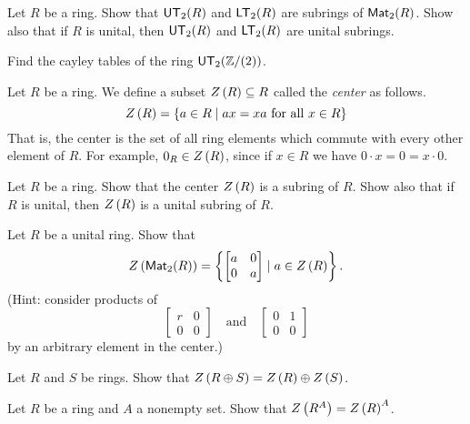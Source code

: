 \begin{exercise}
Let \(R\) be a ring.
Show that \(\mathsf{UT}_{2}(R)\) and \(\mathsf{LT}_{2}(R)\) are subrings of \(\mathsf{Mat}_{2}(R)\).
Show also that if \(R\) is unital, then \(\mathsf{UT}_{2}(R)\) and \(\mathsf{LT}_{2}(R)\) are unital subrings.
\end{exercise}

\begin{exercise}
Find the cayley tables of the ring \(\mathsf{UT}_{2}(\mathbb{Z}/(2))\).
\end{exercise}

\begin{dfn}[Center] \label{dfn:center}
Let \(R\) be a ring.
We define a subset \( Z\left(R\right)  \subseteq R\) called the \emph{center} as follows.
\[ \CENTER{R} = \{ a \in R \mid ax = xa\ \mathrm{for\ all}\ x \in R \} \] That is, the center is the set of all ring elements which commute with every other element of \(R\).
For example, \(0_R \in  Z\left(R\right) \), since if \(x \in R\) we have \(0 \cdot x = 0 = x \cdot 0\).
\end{dfn}

\begin{exercise}
Let \(R\) be a ring.
Show that the center \( Z\left(R\right) \) is a subring of \(R\).
Show also that if \(R\) is unital, then \( Z\left(R\right) \) is a unital subring of \(R\).
\end{exercise}

\begin{exercise}
Let \(R\) be a unital ring.
Show that \[  Z\left(\mathsf{Mat}_{2}(R)\right)  = \left\{ \begin{bmatrix} a & 0 \\ 0 & a \end{bmatrix} \mid a \in  Z\left(R\right)  \right\}. \] (Hint: consider products of \[ \begin{bmatrix} r & 0 \\ 0 & 0 \end{bmatrix} \quad \mathrm{and} \quad \begin{bmatrix} 0 & 1 \\ 0 & 0 \end{bmatrix} \] by an arbitrary element in the center.)
\end{exercise}

\begin{exercise}
Let \(R\) and \(S\) be rings.
Show that \( Z\left(R \oplus S\right)  =  Z\left(R\right)  \oplus  Z\left(S\right) \).
\end{exercise}

\begin{exercise}
Let \(R\) be a ring and \(A\) a nonempty set.
Show that \( Z\left(R^A\right)  =  Z\left(R\right) ^A\).
\end{exercise}

